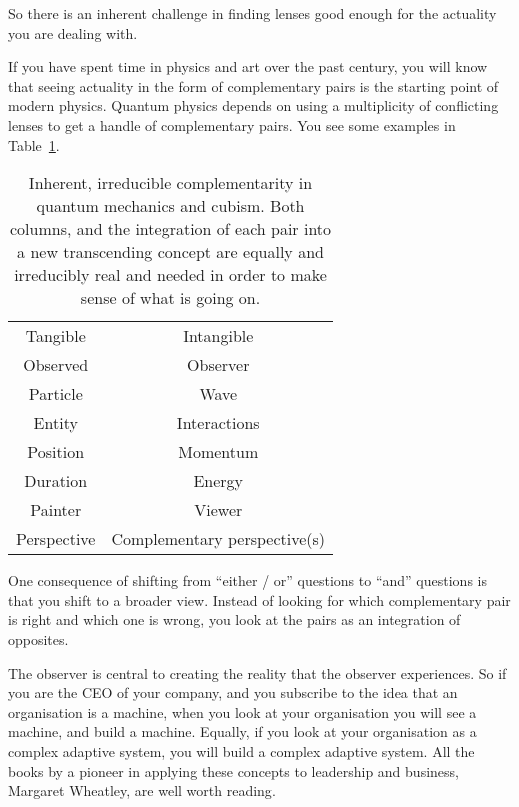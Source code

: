 So there is an inherent challenge in finding lenses good enough for the actuality you are dealing with. 


If you have spent time in physics and art over the past century, you will know that seeing actuality in the form of complementary pairs is the starting point of modern physics. Quantum physics depends on using a multiplicity of conflicting lenses to get a handle of complementary pairs. You see some examples in Table~\ref{table:complementary-pairs}. 




\begin{table}[htbp]
\centering
\begin{tabular}{ c  c  }
\toprule
Tangible & Intangible \\
Observed & Observer \\
Particle & Wave \\
Entity & Interactions \\ 
Position & Momentum \\
Duration & Energy \\
Painter & Viewer \\
Perspective & Complementary perspective(s) \\
\bottomrule
\end{tabular}
\caption[Complementarity in quantum mechanics and cubism]{Inherent, irreducible complementarity in quantum mechanics and cubism. Both columns, and the integration of each pair into a new transcending concept are equally and irreducibly real and needed in order to make sense of what is going on.}
\label{table:complementary-pairs}
\end{table}


One consequence of shifting from “either / or” questions to “and” questions is that you shift to a broader view. Instead of looking for which complementary pair is right and which one is wrong, you look at the pairs as an integration of opposites. 


The observer is central to creating the reality that the observer experiences. So if you are the CEO of your company, and you subscribe to the idea that an organisation is a machine, when you look at your organisation you will see a machine, and build a machine. Equally, if you look at your organisation as a complex adaptive system, you will build a complex adaptive system. All the books by a pioneer in applying these concepts to leadership and business, Margaret Wheatley, are well worth reading\cite{wheatley-leadership,wheatley-lost-found}.



